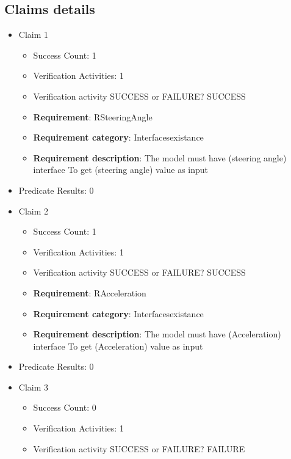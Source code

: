 \documentclass{article}
\begin{document}
			\subsection{Claims details}
			\begin{itemize}
  				  \item Claim 1
				\begin{itemize}
			    	\item Success Count: 1 
			    	\item Verification Activities: 1
					\item Verification activity SUCCESS or FAILURE? SUCCESS
		
						\item \textbf{Requirement}: RSteeringAngle 
						\item \textbf{Requirement category}: Interfacesexistance 
						\item \textbf{Requirement description}: The model must have (steering angle) interface To get (steering angle) value as input
					
				\end{itemize}
				
									    
				\item Predicate Results: 0

  				  \item Claim 2
				\begin{itemize}
			    	\item Success Count: 1 
			    	\item Verification Activities: 1
					\item Verification activity SUCCESS or FAILURE? SUCCESS
		
						\item \textbf{Requirement}: RAcceleration 
						\item \textbf{Requirement category}: Interfacesexistance 
						\item \textbf{Requirement description}: The model must have (Acceleration) interface To get (Acceleration) value as input
					
				\end{itemize}
				
									    
				\item Predicate Results: 0

  				  \item Claim 3
				\begin{itemize}
			    	\item Success Count: 0 
			    	\item Verification Activities: 1
					\item Verification activity SUCCESS or FAILURE? FAILURE
		

\end{itemize}
\end{itemize}
\end{document}
